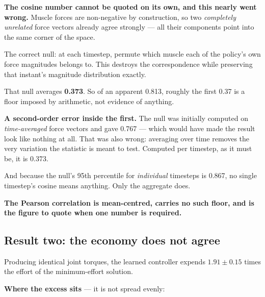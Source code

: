 \begin{trap}
\textbf{The cosine number cannot be quoted on its own, and this nearly went
wrong.} Muscle forces are non-negative by construction, so two \emph{completely
unrelated} force vectors already agree strongly --- all their components point
into the same corner of the space.

The correct null: at each timestep, permute which muscle each of the policy's own
force magnitudes belongs to. This destroys the correspondence while preserving
that instant's magnitude distribution exactly.

That null averages \textbf{0.373}. So of an apparent 0.813, roughly the first
0.37 is a floor imposed by arithmetic, not evidence of anything.

\textbf{A second-order error inside the first.} The null was initially computed on
\emph{time-averaged} force vectors and gave 0.767 --- which would have made the
result look like nothing at all. That was also wrong: averaging over time removes
the very variation the statistic is meant to test. Computed per timestep, as it
must be, it is 0.373.

And because the null's 95th percentile for \emph{individual} timesteps is 0.867,
no single timestep's cosine means anything. Only the aggregate does.

\textbf{The Pearson correlation is mean-centred, carries no such floor, and is
the figure to quote when one number is required.}
\end{trap}

\subsection{Result two: the economy does not agree}

Producing identical joint torques, the learned controller expends
$\mathbf{1.91 \pm 0.15}$ times the effort of the minimum-effort solution.

\textbf{Where the excess sits} --- it is not spread evenly:

